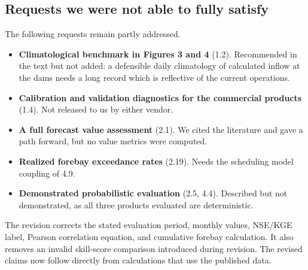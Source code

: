 \documentclass[11pt]{article}
\begin{document}
\subsection*{Requests we were not able to fully satisfy}

The following requests remain partly addressed.

\begin{itemize}[leftmargin=1.4em,itemsep=0.1em]
\item \textbf{Climatological benchmark in Figures 3 and 4} (1.2). Recommended in the text but not added:
a defensible daily climatology of calculated inflow at the dams needs a long record which is reflective of the current operations.
\item \textbf{Calibration and validation diagnostics for the commercial products} (1.4). Not released to
us by either vendor.
\item \textbf{A full forecast value assessment} (2.1). We cited the literature and gave a path forward,
but no value metrics were computed.
\item \textbf{Realized forebay exceedance rates} (2.19). Needs the scheduling model coupling of 4.9.
\item \textbf{Demonstrated probabilistic evaluation} (2.5, 4.4). Described but not demonstrated, as all
three products evaluated are deterministic.
\end{itemize}

\vspace{0.4em}

The revision corrects the stated evaluation period, monthly values, NSE/KGE label, Pearson
correlation equation, and cumulative forebay calculation. It also removes an invalid skill-score
comparison introduced during revision. The revised claims now follow directly from calculations
that use the published data.
\end{document}
